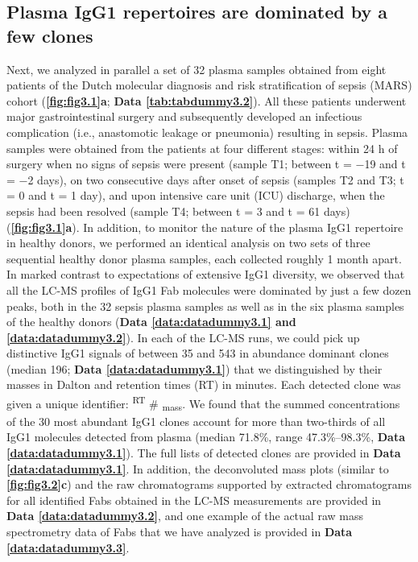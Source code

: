 \subsection{Plasma IgG1 repertoires are dominated by a few clones}
Next, we analyzed in parallel a set of 32 plasma samples obtained from eight patients of the Dutch molecular diagnosis and risk stratification of sepsis (MARS) cohort (\textbf{\autoref{fig:fig3.1}a}; \textbf{Data \ref{tab:tabdummy3.2}}). All these patients underwent major gastrointestinal surgery and subsequently developed an infectious complication (i.e., anastomotic leakage or pneumonia) resulting in sepsis. Plasma samples were obtained from the patients at four different stages: within 24 h of surgery when no signs of sepsis were present (sample T1; between t = −19 and t = −2 days), on two consecutive days after onset of sepsis (samples T2 and T3; t = 0 and t = 1 day), and upon intensive care unit (ICU) discharge, when the sepsis had been resolved (sample T4; between t = 3 and t = 61 days) (\textbf{\autoref{fig:fig3.1}a}). In addition, to monitor the nature of the plasma IgG1 repertoire in healthy donors, we performed an identical analysis on two sets of three sequential healthy donor plasma samples, each collected roughly 1 month apart.
In marked contrast to expectations of extensive IgG1 diversity, we observed that all the LC-MS profiles of IgG1 Fab molecules were dominated by just a few dozen peaks, both in the 32 sepsis plasma samples as well as in the six plasma samples of the healthy donors (\textbf{Data \ref{data:datadummy3.1} and \ref{data:datadummy3.2}}). In each of the LC-MS runs, we could pick up distinctive IgG1 signals of between 35 and 543 in abundance dominant clones (median 196; \textbf{Data \ref{data:datadummy3.1}}) that we distinguished by their masses in Dalton and retention times (RT) in minutes. Each detected clone was given a unique identifier: \textsuperscript{RT} \# \textsubscript{mass}.
We found that the summed concentrations of the 30 most abundant IgG1 clones account for more than two-thirds of all IgG1 molecules detected from plasma (median 71.8\%, range 47.3\%–98.3\%, \textbf{Data \ref{data:datadummy3.1}}). The full lists of detected clones are provided in \textbf{Data \ref{data:datadummy3.1}}. In addition, the deconvoluted mass plots (similar to \textbf{\autoref{fig:fig3.2}c}) and the raw chromatograms supported by extracted chromatograms for all identified Fabs obtained in the LC-MS measurements are provided in \textbf{Data \ref{data:datadummy3.2}}, and one example of the actual raw mass spectrometry data of Fabs that we have analyzed is provided in \textbf{Data \ref{data:datadummy3.3}}.



